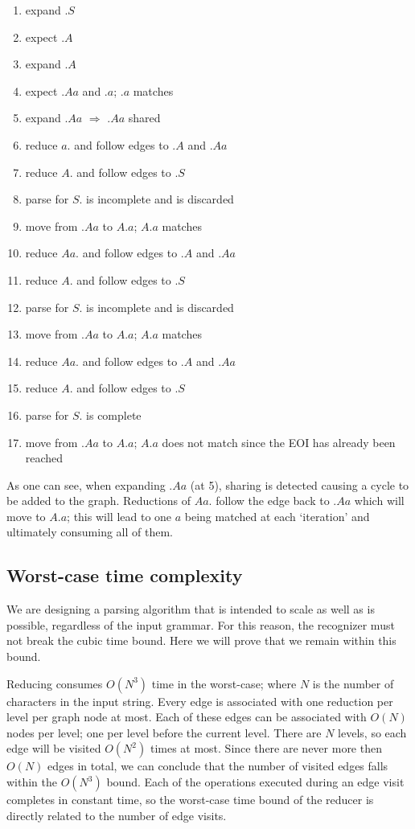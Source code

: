 \documentclass[a4paper,10pt]{article}
\begin{document}
\begin{enumerate}
 \setlength{\itemsep}{0pt}
 \setlength{\parskip}{0pt}
 \setlength{\parsep}{0pt}
 
 \item expand $.S$
 \item expect $.A$
 \item expand $.A$
 \item expect $.Aa$ and $.a$; $.a$ matches
 \item expand $.Aa$ $\Rightarrow$ $.Aa$ shared
 \item reduce $a.$ and follow edges to $.A$ and $.Aa$
 \item reduce $A.$ and follow edges to $.S$
 \item parse for $S.$ is incomplete and is discarded
 \item move from $.Aa$ to $A.a$; $A.a$ matches
 \item reduce $Aa.$ and follow edges to $.A$ and $.Aa$
 \item reduce $A.$ and follow edges to $.S$
 \item parse for $S.$ is incomplete and is discarded
 \item move from $.Aa$ to $A.a$; $A.a$ matches
 \item reduce $Aa.$ and follow edges to $.A$ and $.Aa$
 \item reduce $A.$ and follow edges to $.S$
 \item parse for $S.$ is complete
 \item move from $.Aa$ to $A.a$; $A.a$ does not match since the EOI has already been reached
\end{enumerate}
As one can see, when expanding $.Aa$ (at 5), sharing is detected causing a cycle to be added to the graph. Reductions of $Aa.$ follow the edge back to $.Aa$ which will move to $A.a$; this will lead to one $a$ being matched at each `iteration' and ultimately consuming all of them.

\subsection{Worst-case time complexity}
\label{subsec:recognizerComplexity}

We are designing a parsing algorithm that is intended to scale as well as is possible, regardless of the input grammar. For this reason, the recognizer must not break the cubic time bound. Here we will prove that we remain within this bound.

Reducing consumes $O(N^3)$ time in the worst-case; where $N$ is the number of characters in the input string. Every edge is associated with one reduction per level per graph node at most. Each of these edges can be associated with $O(N)$ nodes per level; one per level before the current level. There are $N$ levels, so each edge will be visited $O(N^2)$ times at most. Since there are never more then $O(N)$ edges in total, we can conclude that the number of visited edges falls within the $O(N^3)$ bound. Each of the operations executed during an edge visit completes in constant time, so the worst-case time bound of the reducer is directly related to the number of edge visits.
\end{document}
